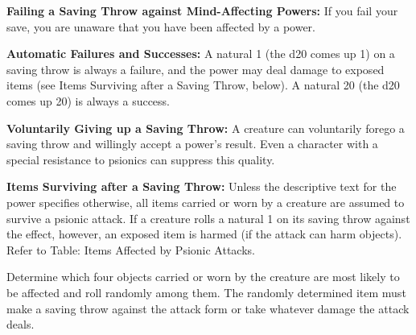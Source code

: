 \textbf{Failing a Saving Throw against Mind-Affecting Powers:} If you fail your save, you are unaware that you have been affected by a power.

\textbf{Automatic Failures and Successes:} A natural 1 (the d20 comes up 1) on a saving throw is always a failure, and the power may deal damage to exposed items (see Items Surviving after a Saving Throw, below). A natural 20 (the d20 comes up 20) is always a success.

\textbf{Voluntarily Giving up a Saving Throw:} A creature can voluntarily forego a saving throw and willingly accept a power's result. Even a character with a special resistance to psionics can suppress this quality.

\textbf{Items Surviving after a Saving Throw:} Unless the descriptive text for the power specifies otherwise, all items carried or worn by a creature are assumed to survive a psionic attack. If a creature rolls a natural 1 on its saving throw against the effect, however, an exposed item is harmed (if the attack can harm objects). Refer to Table: Items Affected by Psionic Attacks.

Determine which four objects carried or worn by the creature are most likely to be affected and roll randomly among them. The randomly determined item must make a saving throw against the attack form or take whatever damage the attack deals.

